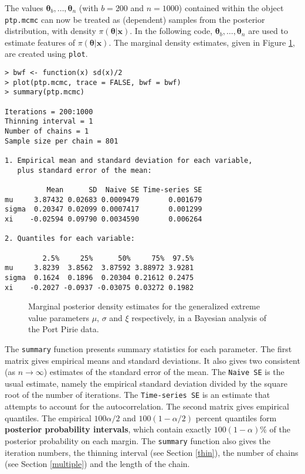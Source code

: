 \documentclass[11pt,a4paper]{article}
\newcommand{\bs}{\boldsymbol}
\begin{document}
The values $\bs{\theta}_b,\dots,\bs{\theta}_n$ (with $b=200$ and $n=1000$) contained within the object \verb+ptp.mcmc+ can now be treated as (dependent) samples from the posterior distribution, with density $\pi(\bs{\theta}|\bs{x})$.
In the following code, $\bs{\theta}_b,\dots,\bs{\theta}_n$ are used to estimate features of $\pi(\bs{\theta}|\bs{x})$.
The marginal density estimates, given in Figure \ref{piriedens}, are created using \verb+plot+.

\begin{verbatim}
> bwf <- function(x) sd(x)/2
> plot(ptp.mcmc, trace = FALSE, bwf = bwf)
> summary(ptp.mcmc)

Iterations = 200:1000
Thinning interval = 1 
Number of chains = 1 
Sample size per chain = 801 

1. Empirical mean and standard deviation for each variable,
   plus standard error of the mean:

          Mean      SD  Naive SE Time-series SE
mu     3.87432 0.02683 0.0009479       0.001679
sigma  0.20347 0.02099 0.0007417       0.001299
xi    -0.02594 0.09790 0.0034590       0.006264

2. Quantiles for each variable:

         2.5%     25%      50%     75%  97.5%
mu     3.8239  3.8562  3.87592 3.88972 3.9281
sigma  0.1624  0.1896  0.20304 0.21612 0.2475
xi    -0.2027 -0.0937 -0.03075 0.03272 0.1982
\end{verbatim}

\begin{figure}
\begin{center}
\vspace{-1.5cm}
\hspace{0cm}
\hspace{0cm}
\end{center}
\caption{Marginal posterior density estimates for the generalized extreme value parameters $\mu$, $\sigma$ and $\xi$ respectively, in a Bayesian analysis of the Port Pirie data.}
\label{piriedens}
\end{figure}

The \verb+summary+ function presents summary statistics for each parameter.
The first matrix gives empirical means and standard deviations.
It also gives two consistent (as $n\rightarrow\infty$) estimates of the standard error of the mean.
The \verb+Naive SE+ is the usual estimate, namely the empirical standard deviation divided by the square root of the number of iterations.
The \verb+Time-series SE+ is an estimate that attempts to account for the autocorrelation.
The second matrix gives empirical quantiles.
The empirical $100\alpha/2$ and $100(1-\alpha/2)$ percent quantiles form \textbf{posterior probability intervals}, which contain exactly $100(1-\alpha)\%$ of the posterior probability on each margin.
The \verb+summary+ function also gives the iteration numbers, the thinning interval (see Section \ref{thin}), the number of chains (see Section \ref{multiple}) and the length of the chain.
\end{document}
